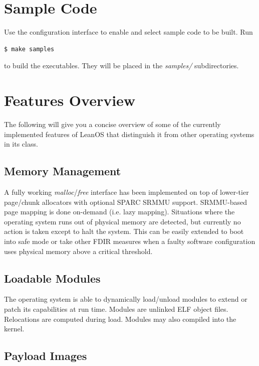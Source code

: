 \section {Sample Code}

Use the configuration interface to enable and select sample code to be built.
Run

\begin{lstlisting}[language=bash]
  $ make samples
\end{lstlisting}

\noindent
to build the executables. They will be placed in the \emph{samples/}
subdirectories.



\section {Features Overview}

The following will give you a concise overview of some of the currently 
implemented features of LeanOS that distinguish it from other operating
systems in its class.

\subsection {Memory Management}

A fully working \emph{malloc}/\emph{free} interface has been implemented on top
of lower-tier page/chunk allocators with optional SPARC SRMMU support.
SRMMU-based page mapping is done on-demand (i.e. lazy mapping). Situations
where the operating system runs out of physical memory are detected, but
currently no action is taken except to halt the system. This can be easily
extended to boot into safe mode or take other FDIR measures when a faulty
software configuration uses physical memory above a critical threshold.

\subsection {Loadable Modules}

The operating system is able to dynamically load/unload modules to extend
or patch its capabilities at run time. Modules are unlinked ELF object files.
Relocations are computed during load. Modules may also compiled into the kernel.

\subsection {Payload Images}

